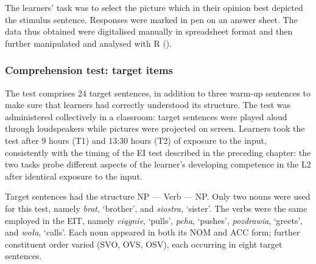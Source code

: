 The learners' task was to select the picture which in their opinion best depicted the stimulus sentence. Responses were marked in pen on an answer sheet. The data thus obtained were digitalised manually in spreadsheet format and then further manipulated and analysed with R (\citealt{RCoreTeam2017}).

\subsubsection{Comprehension test: target items}

The test comprises 24 target sentences, in addition to three warm-up sentences to make sure that learners had correctly understood its structure. The test was administered collectively in a classroom: target sentences were played aloud through loudspeakers while pictures were projected on screen. Learners took the test after 9 hours (T1) and 13:30 hours (T2) of exposure to the input, consistently with the timing of the EI test described in the preceding chapter: the two tasks probe different aspects of the learner's developing competence in the L2 after identical exposure to the input.

Target sentences had the structure NP — Verb — NP. Only two nouns were used for this test, namely \textit{brat}, ‘brother’, and \textit{siostra}, ‘sister’. The verbs were the same employed in the EIT, namely \textit{ciągnie}, ‘pulls’,  \textit{pcha}, ‘pushes’, \textit{pozdrawia}, ‘greets’, and \textit{woła}, ‘calls’. Each noun appeared in both its NOM and ACC form; further constituent order varied (SVO, OVS, OSV), each occurring in eight target sentences. 

\begin{table}
    \caption{Comprehension test, example of target sentences with the verb \textit{woła}}
    \label{tab:02:14}
\end{table}

